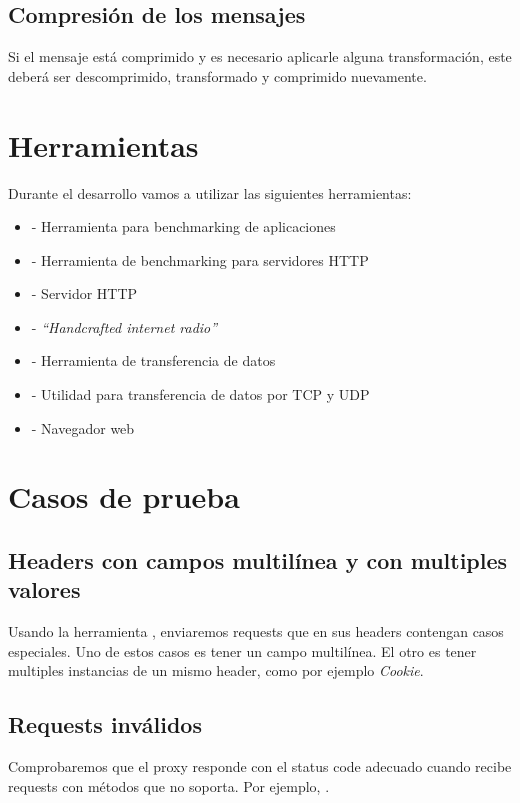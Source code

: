 \documentclass[11pt,a4paper,titlepage]{article}
\begin{document}
\subsection{Compresión de los mensajes}
Si el mensaje está comprimido y es necesario aplicarle alguna transformación, este deberá ser descomprimido, transformado y comprimido nuevamente.

\section{Herramientas}
    Durante el desarrollo vamos a utilizar las siguientes herramientas:
    \begin{itemize}
        \item {} - Herramienta para benchmarking de aplicaciones
        \item {} - Herramienta de benchmarking para servidores HTTP
        \item {} - Servidor HTTP
        \item {} - \emph{``Handcrafted internet radio''}
        \item {} - Herramienta de transferencia de datos
        \item {} - Utilidad para transferencia de datos por TCP y UDP
        \item {} - Navegador web
    \end{itemize}

\section{Casos de prueba}
\subsection{Headers con campos multilínea y con multiples valores}
Usando la herramienta , enviaremos requests que en sus headers contengan casos especiales.
Uno de estos casos es tener un campo multilínea.
El otro es tener multiples instancias de un mismo header, como por ejemplo \textit{Cookie}.

\subsection{Requests inválidos}
Comprobaremos que el proxy responde con el status code adecuado cuando recibe requests con métodos que no soporta.
Por ejemplo, .
\end{document}
